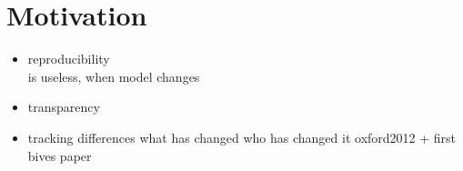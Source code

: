 \section{Motivation}
\begin{itemize}
	\item reproducibility\\
		\sedml is useless, when model changes
	\item transparency
	\item tracking differences
	\subitem what has changed
	\subitem who has changed it
	\subitem oxford2012 + first bives paper
\end{itemize}